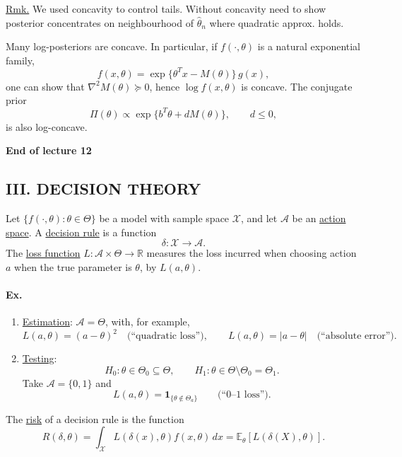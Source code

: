 \documentclass[11pt,a4paper]{article}
\begin{document}
\medskip
\noindent\underline{Rmk.}\quad
We used concavity to control tails. Without concavity need to show posterior
concentrates on neighbourhood of $\hat\theta_n$ where quadratic approx. holds.

Many log-posteriors are concave. In particular, if $f(\cdot,\theta)$ is a
natural exponential family,
\[
f(x,\theta)=\exp\{\theta^T x-M(\theta)\}\,g(x),
\]
one can show that $\nabla^2 M(\theta)\succeq0$, hence $\log f(x,\theta)$ is concave.
The conjugate prior
\[
\Pi(\theta)\propto\exp\{b^T\theta+dM(\theta)\},\qquad d\leq0,
\]
is also log-concave.

\begin{center}
\textbf{End of lecture 12}
\end{center}

\newpage
\subsection*{III. DECISION THEORY}

Let $\{f(\cdot,\theta):\theta\in\Theta\}$ be a model with sample space
$\mathcal X$, and let $\mathcal A$ be an \underline{action space}.
A \underline{decision rule} is a function
\[
\delta:\mathcal X\longrightarrow\mathcal A.
\]
The \underline{loss function} $L:\mathcal A\times\Theta\to\mathbb R$
measures the loss incurred when choosing action $a$ when the true parameter
is $\theta$, by $L(a,\theta)$.

\paragraph{Ex.}
\begin{enumerate}
\item \underline{Estimation}: $\mathcal A=\Theta$, with, for example,
\[
L(a,\theta)=(a-\theta)^2\quad\text{(``quadratic loss'')},
\qquad L(a,\theta)=|a-\theta|\quad\text{(``absolute error'')}.
\]
\item \underline{Testing}:
\[
H_0:\theta\in\Theta_0\subseteq\Theta,
\qquad H_1:\theta\in\Theta\setminus\Theta_0=\Theta_1.
\]
Take $\mathcal A=\{0,1\}$ and
\[
L(a,\theta)=\mathbf 1_{\{\theta\notin\Theta_a\}}
\qquad\text{(``0--1 loss'')}.
\]
\end{enumerate}

The \underline{risk} of a decision rule is the function
\[
R(\delta,\theta)
=\int_{\mathcal X}L(\delta(x),\theta)f(x,\theta)\,dx
=\mathbb E_\theta[L(\delta(X),\theta)].
\]
\end{document}
